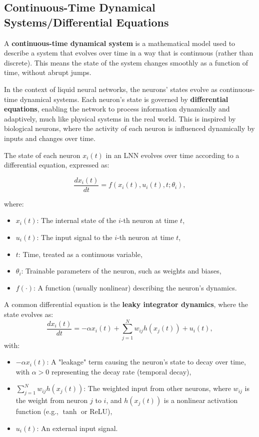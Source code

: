 \subsection{Continuous-Time Dynamical Systems/Differential Equations}

A \textbf{continuous-time dynamical system} is a mathematical model used to describe a system that evolves over time in a way that is continuous (rather than discrete). This means the state of the system changes smoothly as a function of time, without abrupt jumps.

In the context of liquid neural networks, the neurons' states evolve as continuous-time dynamical systems. Each neuron’s state is governed by \textbf{differential equations}, enabling the network to process information dynamically and adaptively, much like physical systems in the real world. This is inspired by biological neurons, where the activity of each neuron is influenced dynamically by inputs and changes over time.

The state of each neuron \(x_i(t)\) in an LNN evolves over time according to a differential equation, expressed as:

\begin{equation} \label{eq:1}
    \frac{dx_i(t)}{dt} = f(x_i(t), u_i(t), t; \theta_i),
    \end{equation}

where:
\begin{itemize}
    \item \(x_i(t)\): The internal state of the \(i\)-th neuron at time \(t\),
    \item \(u_i(t)\): The input signal to the \(i\)-th neuron at time \(t\),
    \item \(t\): Time, treated as a continuous variable,
    \item \(\theta_i\): Trainable parameters of the neuron, such as weights and biases,
    \item \(f(\cdot)\): A function (usually nonlinear) describing the neuron’s dynamics.
\end{itemize}

A common differential equation is the \textbf{leaky integrator dynamics}, where the state evolves as:
\[
\frac{dx_i(t)}{dt} = -\alpha x_i(t) + \sum_{j=1}^N w_{ij} h(x_j(t)) + u_i(t),
\]
with:
\begin{itemize}
    \item \(-\alpha x_i(t)\): A "leakage" term causing the neuron’s state to decay over time, with \(\alpha > 0\) representing the decay rate (temporal decay),
    \item \(\sum_{j=1}^N w_{ij} h(x_j(t))\): The weighted input from other neurons, where \(w_{ij}\) is the weight from neuron \(j\) to \(i\), and \(h(x_j(t))\) is a nonlinear activation function (e.g., \(\tanh\) or ReLU),
    \item \(u_i(t)\): An external input signal.
\end{itemize}

